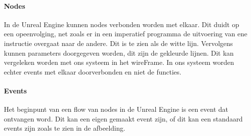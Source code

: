 \documentclass[]{article}
\begin{document}
\paragraph{Nodes}
In de Unreal Engine kunnen nodes verbonden worden met elkaar. Dit duidt op een opeenvolging, net zoals er in een imperatief programma de uitvoering van ene instructie overgaat naar de andere. Dit is te zien als de witte lijn. Vervolgens kunnen parameters doorgegeven worden, dit zijn de gekleurde lijnen. Dit kan vergeleken worden met ons systeem in het wireFrame. In ons systeem worden echter events met elkaar doorverbonden en niet de functies. \cite{unreal}
\paragraph{Events}
Het beginpunt van een flow van nodes in de Unreal Engine is een event dat ontvangen word. Dit kan een eigen gemaakt event zijn, of dit kan een standaard events zijn zoals te zien in de afbeelding.
\end{document}
